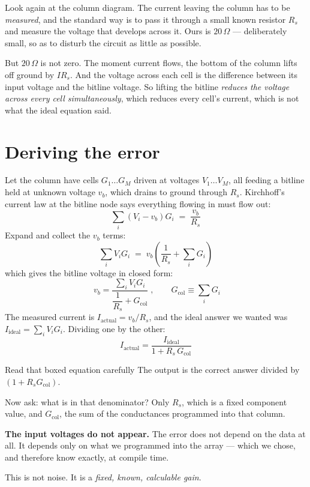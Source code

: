 \documentclass[11pt,a4paper]{report}
\begin{document}
Look again at the column diagram. The current leaving the column has to be
\emph{measured}, and the standard way is to pass it through a small known
resistor $R_s$ and measure the voltage that develops across it. Ours is
$20\,\Omega$ --- deliberately small, so as to disturb the circuit as little as
possible.

But $20\,\Omega$ is not zero. The moment current flows, the bottom of the
column lifts off ground by $I R_s$. And the voltage across each cell is the
difference between its input voltage and the bitline voltage. So lifting the
bitline \emph{reduces the voltage across every cell simultaneously}, which
reduces every cell's current, which is not what the ideal equation said.

\section{Deriving the error}

Let the column have cells $G_1 \dots G_M$ driven at voltages $V_1 \dots V_M$,
all feeding a bitline held at unknown voltage $v_b$, which drains to ground
through $R_s$. Kirchhoff's current law at the bitline node says everything
flowing in must flow out:
\[
\sum_i (V_i - v_b) G_i \;=\; \frac{v_b}{R_s}
\]
Expand and collect the $v_b$ terms:
\[
\sum_i V_i G_i \;=\; v_b\left(\frac{1}{R_s} + \sum_i G_i\right)
\]
which gives the bitline voltage in closed form:
\[
\boxed{\;v_b = \frac{\sum_i V_i G_i}{\dfrac{1}{R_s} + G_{\mathrm{col}}}\;},
\qquad G_{\mathrm{col}} \equiv \sum_i G_i
\]
The measured current is $I_{\text{actual}} = v_b / R_s$, and the ideal answer we
wanted was $I_{\text{ideal}} = \sum_i V_i G_i$. Dividing one by the other:
\[
\boxed{\;I_{\text{actual}} = \frac{I_{\text{ideal}}}{1 + R_s\,G_{\mathrm{col}}}\;}
\]

\begin{keybox}{Read that boxed equation carefully}
The output is the correct answer divided by $(1 + R_s G_{\mathrm{col}})$.

Now ask: what is in that denominator? Only $R_s$, which is a fixed component
value, and $G_{\mathrm{col}}$, the sum of the conductances programmed into that
column.

\textbf{The input voltages do not appear.} The error does not depend on the
data at all. It depends only on what we programmed into the array --- which we
chose, and therefore know exactly, at compile time.

This is not noise. It is a \emph{fixed, known, calculable gain}.
\end{keybox}
\end{document}
